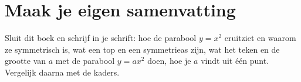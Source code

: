 \ifzelfstudie
\section*{Maak je eigen samenvatting}
Sluit dit boek en schrijf in je schrift: hoe de parabool $y = x^2$ eruitziet en waarom ze symmetrisch is, wat een top en een symmetrieas zijn, wat het teken en de grootte van $a$ met de parabool $y = ax^2$ doen, hoe je $a$ vindt uit één punt. Vergelijk daarna met de kaders.
\fi
